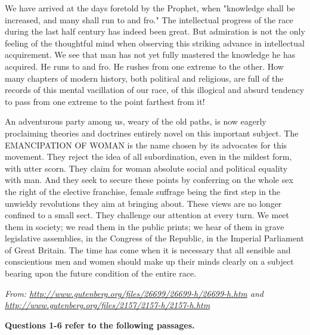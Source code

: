 \begin{linenumbers*}
\indent We have arrived at the days foretold by the Prophet, when "knowledge shall be increased, and many shall run to and fro." The intellectual progress of the race during the last half century has indeed been great. But admiration is not the only feeling of the thoughtful mind when observing this striking advance in intellectual acquirement. We see that man has not yet fully mastered the knowledge he has acquired. He runs to and fro. He rushes from one extreme to the other. How many chapters of modern history, both political and religious, are full of the records of this mental vacillation of our race, of this illogical and absurd tendency to pass from one extreme to the point farthest from it!

\indent An adventurous party among us, weary of the old paths, is now eagerly proclaiming theories and doctrines entirely novel on this important subject. The EMANCIPATION OF WOMAN is the name chosen by its advocates for this movement. They reject the idea of all subordination, even in the mildest form, with utter scorn. They claim for woman absolute social and political equality with man. And they seek to secure these points by conferring on the whole sex the right of the elective franchise, female suffrage being the first step in the unwieldy revolutions they aim at bringing about. These views are no longer confined to a small sect. They challenge our attention at every turn. We meet them in society; we read them in the public prints; we hear of them in grave legislative assemblies, in the Congress of the Republic, in the Imperial Parliament of Great Britain. The time has come when it is necessary that all sensible and conscientious men and women should make up their minds clearly on a subject bearing upon the future condition of the entire race.
\end{linenumbers*}

\bigskip
\textit{From: \url{http://www.gutenberg.org/files/26699/26699-h/26699-h.htm} and \url{http://www.gutenberg.org/files/2157/2157-h/2157-h.htm}}

\bigskip
\textbf{Questions 1-6 refer to the following passages.}

\begin{linenumbers*}
\modulolinenumbers[5]
\indent
\end{linenumbers*}


